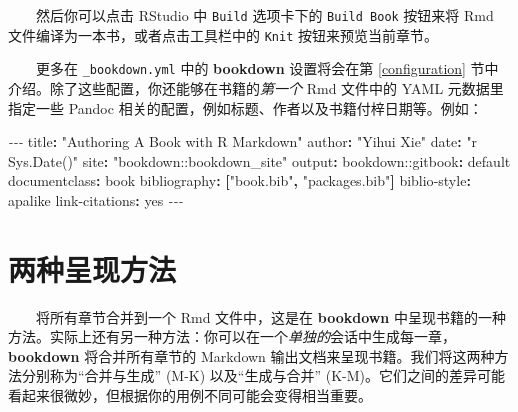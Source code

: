 \documentclass[
  12pt,
]{krantz}
\newenvironment{Shaded}{\begin{snugshade}}{\end{snugshade}}
\newcommand{\AttributeTok}[1]{\textcolor[rgb]{0.77,0.63,0.00}{#1}}
\newcommand{\CharTok}[1]{\textcolor[rgb]{0.31,0.60,0.02}{#1}}
\newcommand{\FunctionTok}[1]{\textcolor[rgb]{0.00,0.00,0.00}{#1}}
\newcommand{\KeywordTok}[1]{\textcolor[rgb]{0.13,0.29,0.53}{\textbf{#1}}}
\newcommand{\PreprocessorTok}[1]{\textcolor[rgb]{0.56,0.35,0.01}{\textit{#1}}}
\newcommand{\StringTok}[1]{\textcolor[rgb]{0.31,0.60,0.02}{#1}}
\theoremstyle{definition}
\theoremstyle{definition}
\theoremstyle{definition}
\theoremstyle{definition}
\theoremstyle{remark}
\begin{document}
  然后你可以点击 RStudio 中 \texttt{Build} 选项卡下的 \texttt{Build\ Book} 按钮来将 Rmd 文件编译为一本书，或者点击工具栏中的 \texttt{Knit} 按钮来预览当前章节。

  更多在 \texttt{\_bookdown.yml} 中的 \textbf{bookdown} 设置将会在第 \ref{configuration} 节中介绍。除了这些配置，你还能够在书籍的\emph{第一个} Rmd 文件中的 YAML 元数据里指定一些 Pandoc 相关的配置，例如标题、作者以及书籍付梓日期等。例如：

\begin{Shaded}
\begin{Highlighting}[]
\PreprocessorTok{{-}{-}{-} }
\FunctionTok{title}\KeywordTok{:}\AttributeTok{ }\StringTok{"Authoring A Book with R Markdown"}
\FunctionTok{author}\KeywordTok{:}\AttributeTok{ }\StringTok{"Yihui Xie"}
\FunctionTok{date}\KeywordTok{:}\AttributeTok{ }\StringTok{"\textasciigrave{}r Sys.Date()\textasciigrave{}"}
\FunctionTok{site}\KeywordTok{:}\AttributeTok{ }\StringTok{"bookdown::bookdown\_site"}
\FunctionTok{output}\KeywordTok{:}
\AttributeTok{  bookdown:}\FunctionTok{:gitbook}\KeywordTok{:}\AttributeTok{ default}
\FunctionTok{documentclass}\KeywordTok{:}\AttributeTok{ book}
\FunctionTok{bibliography}\KeywordTok{:}\AttributeTok{ }\KeywordTok{[}\StringTok{"book.bib"}\KeywordTok{,}\AttributeTok{ }\StringTok{"packages.bib"}\KeywordTok{]}
\FunctionTok{biblio{-}style}\KeywordTok{:}\AttributeTok{ apalike}
\FunctionTok{link{-}citations}\KeywordTok{:}\AttributeTok{ }\CharTok{yes}
\PreprocessorTok{{-}{-}{-}}
\end{Highlighting}
\end{Shaded}

\hypertarget{new-session}{%
\section{两种呈现方法}\label{new-session}}

  将所有章节合并到一个 Rmd 文件中，这是在 \textbf{bookdown} 中呈现书籍的一种方法。实际上还有另一种方法：你可以在一个\emph{单独的}会话中生成每一章，\textbf{bookdown} 将合并所有章节的 Markdown 输出文档来呈现书籍。我们将这两种方法分别称为``合并与生成'' (M-K) 以及``生成与合并'' (K-M)。它们之间的差异可能看起来很微妙，但根据你的用例不同可能会变得相当重要。
\end{document}
